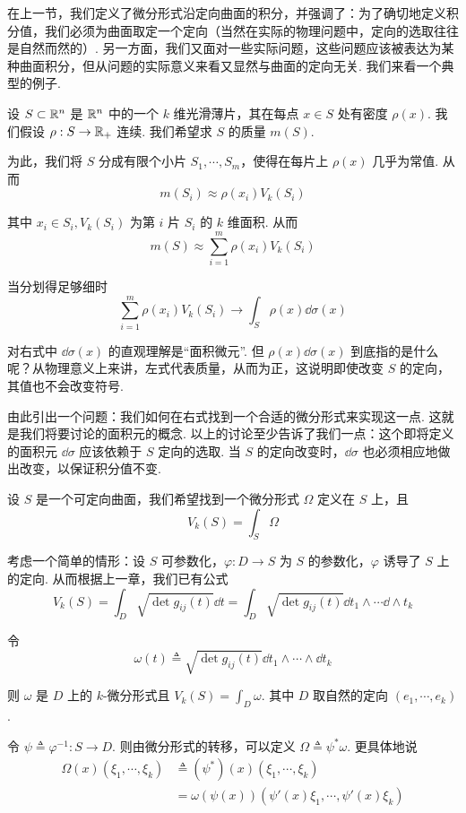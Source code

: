 
在上一节，我们定义了微分形式沿定向曲面的积分，并强调了：为了确切地定义积分值，我们必须为曲面取定一个定向（当然在实际的物理问题中，定向的选取往往是自然而然的）. 另一方面，我们又面对一些实际问题，这些问题应该被表达为某种曲面积分，但从问题的实际意义来看又显然与曲面的定向无关. 我们来看一个典型的例子.

设 $S\subset\mathbb{R}^n$ 是 $\mathbb{R}^n$ 中的一个 $k$ 维光滑薄片，其在每点 $x\in S$ 处有密度 $\rho(x)$. 我们假设 $\rho:S\to\mathbb{R}_+$ 连续. 我们希望求 $S$ 的质量 $m(S)$.

为此，我们将 $S$ 分成有限个小片 $S_1,\cdots,S_m$，使得在每片上 $\rho(x)$ 几乎为常值. 从而
$$
m(S_i)\approx\rho(x_i)V_k(S_i)
$$

其中 $x_i\in S_i,V_k(S_i)$ 为第 $i$ 片 $S_i$ 的 $k$ 维面积. 从而
$$
m(S)\approx\sum_{i=1}^m\rho(x_i)V_k(S_i)
$$

当分划得足够细时
$$
\sum_{i=1}^m\rho(x_i)V_k(S_i)\longrightarrow\int_S\rho(x)\dd\sigma(x)
$$

对右式中 $\dd\sigma(x)$ 的直观理解是“面积微元”. 但 $\rho(x)\dd\sigma(x)$ 到底指的是什么呢？从物理意义上来讲，左式代表质量，从而为正，这说明即使改变 $S$ 的定向，其值也不会改变符号.

由此引出一个问题：我们如何在右式找到一个合适的微分形式来实现这一点. 这就是我们将要讨论的面积元的概念. 以上的讨论至少告诉了我们一点：这个即将定义的面积元 $\dd\sigma$ 应该依赖于 $S$ 定向的选取. 当 $S$ 的定向改变时，$\dd\sigma$ 也必须相应地做出改变，以保证积分值不变.


设 $S$ 是一个可定向曲面，我们希望找到一个微分形式 $\Omega$ 定义在 $S$ 上，且
$$
V_k(S)=\int_S\Omega
$$

考虑一个简单的情形：设 $S$ 可参数化，$\varphi:D\to S$ 为 $S$ 的参数化，$\varphi$ 诱导了 $S$ 上的定向. 从而根据上一章，我们已有公式
$$
V_k(S)=\int_D\sqrt{\det g_{ij}(t)}\dd t=\int_D\sqrt{\det g_{ij}(t)}\dd t_1\wedge\cdots\dd\wedge t_k
$$

令
$$
\omega(t)\triangleq\sqrt{\det g_{ij}(t)}\dd t_1\wedge\cdots\wedge\dd t_k
$$

则 $\omega$ 是 $D$ 上的 $k$-微分形式且 $\displaystyle V_k(S)=\int_D\omega$. 其中 $D$ 取自然的定向 $(e_1,\cdots,e_k)$.

令 $\psi\triangleq\varphi^{-1}:S\to D$. 则由微分形式的转移，可以定义 $\Omega\triangleq\psi^*\omega$. 更具体地说
$$
\begin{aligned}
    \Omega(x)(\xi_1,\cdots,\xi_k)&\triangleq(\psi^*)(x)(\xi_1,\cdots,\xi_k)\\
    &=\omega(\psi(x))(\psi'(x)\xi_1,\cdots,\psi'(x)\xi_k)
\end{aligned}
$$

